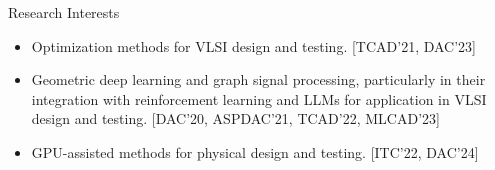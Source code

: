 
\begin{rSection}{Research Interests}
    
\begin{itemize}
    \item Optimization methods for VLSI design and testing. {[TCAD'21, DAC'23]}
    \item Geometric deep learning and graph signal processing, particularly in their integration with reinforcement learning and LLMs for application in VLSI design and testing. {[DAC'20, ASPDAC'21, TCAD'22, MLCAD'23]}
    \item GPU-assisted methods for physical design and testing. {[ITC'22, DAC'24]}
\end{itemize}
\end{rSection}




